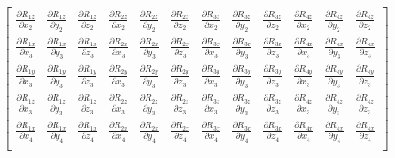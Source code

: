 \begin{eqnarray}
\begin{bmatrix}
\frac{\partial R_{1z}}{\partial x_2} & \frac{\partial R_{1z}}{\partial y_2} & \frac{\partial R_{1z}}{\partial z_2} & \frac{\partial R_{2z}}{\partial x_2} & \frac{\partial R_{2z}}{\partial y_2} & \frac{\partial R_{2z}}{\partial z_2} & \frac{\partial R_{3z}}{\partial x_2} & \frac{\partial R_{3z}}{\partial y_2} & \frac{\partial R_{3z}}{\partial z_2} & \frac{\partial R_{4z}}{\partial x_2} & \frac{\partial R_{4z}}{\partial y_2} & \frac{\partial R_{4z}}{\partial z_2} \\
\frac{\partial R_{1x}}{\partial x_3} & \frac{\partial R_{1x}}{\partial y_3} & \frac{\partial R_{1x}}{\partial z_3} & \frac{\partial R_{2x}}{\partial x_3} & \frac{\partial R_{2x}}{\partial y_3} & \frac{\partial R_{2x}}{\partial z_3} & \frac{\partial R_{3x}}{\partial x_3} & \frac{\partial R_{3x}}{\partial y_3} & \frac{\partial R_{3x}}{\partial z_3} & \frac{\partial R_{4x}}{\partial x_3} & \frac{\partial R_{4x}}{\partial y_3} & \frac{\partial R_{4x}}{\partial z_3} \\
\frac{\partial R_{1y}}{\partial x_3} & \frac{\partial R_{1y}}{\partial y_3} & \frac{\partial R_{1y}}{\partial z_3} & \frac{\partial R_{2y}}{\partial x_3} & \frac{\partial R_{2y}}{\partial y_3} & \frac{\partial R_{2y}}{\partial z_3} & \frac{\partial R_{3y}}{\partial x_3} & \frac{\partial R_{3y}}{\partial y_3} & \frac{\partial R_{3y}}{\partial z_3} & \frac{\partial R_{4y}}{\partial x_3} & \frac{\partial R_{4y}}{\partial y_3} & \frac{\partial R_{4y}}{\partial z_3} \\
\frac{\partial R_{1z}}{\partial x_3} & \frac{\partial R_{1z}}{\partial y_3} & \frac{\partial R_{1z}}{\partial z_3} & \frac{\partial R_{2z}}{\partial x_3} & \frac{\partial R_{2z}}{\partial y_3} & \frac{\partial R_{2z}}{\partial z_3} & \frac{\partial R_{3z}}{\partial x_3} & \frac{\partial R_{3z}}{\partial y_3} & \frac{\partial R_{3z}}{\partial z_3} & \frac{\partial R_{4z}}{\partial x_3} & \frac{\partial R_{4z}}{\partial y_3} & \frac{\partial R_{4z}}{\partial z_3} \\
\frac{\partial R_{1x}}{\partial x_4} & \frac{\partial R_{1x}}{\partial y_4} & \frac{\partial R_{1x}}{\partial z_4} & \frac{\partial R_{2x}}{\partial x_4} & \frac{\partial R_{2x}}{\partial y_4} & \frac{\partial R_{2x}}{\partial z_4} & \frac{\partial R_{3x}}{\partial x_4} & \frac{\partial R_{3x}}{\partial y_4} & \frac{\partial R_{3x}}{\partial z_4} & \frac{\partial R_{4x}}{\partial x_4} & \frac{\partial R_{4x}}{\partial y_4} & \frac{\partial R_{4x}}{\partial z_4} \\

\end{bmatrix}
\end{eqnarray}
